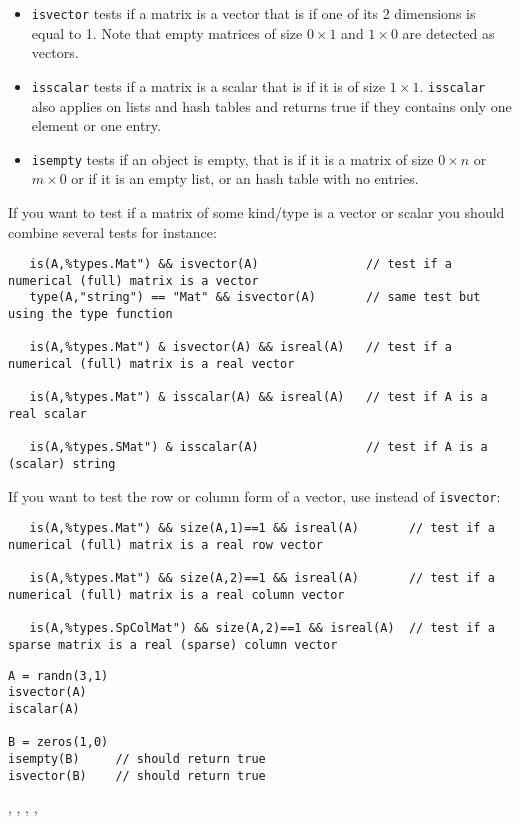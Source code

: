 \begin{mandescription}
\begin{itemize}
\item \verb+isvector+ tests if a matrix is a vector that is if one of its 2 dimensions is equal to 1. 
      Note that empty matrices of size $0 \times 1$ and $1 \times 0$ are detected as vectors.
\item \verb+isscalar+ tests if a matrix is a scalar that is if it is of size $1 \times 1$.
      \verb+isscalar+ also applies on lists and hash tables and returns true if they contains only
      one element or one entry.
\item \verb+isempty+ tests if an object is empty, that is if it is a matrix of size $0 \times n$ or $m \times 0$ or
      if it is an empty list, or an hash table with no entries.
\end{itemize}

If you want to test if a matrix of some kind/type is a vector or scalar you should combine
several tests for instance:
\begin{verbatim}
   is(A,%types.Mat") && isvector(A)               // test if a numerical (full) matrix is a vector
   type(A,"string") == "Mat" && isvector(A)       // same test but using the type function

   is(A,%types.Mat") & isvector(A) && isreal(A)   // test if a numerical (full) matrix is a real vector

   is(A,%types.Mat") & isscalar(A) && isreal(A)   // test if A is a real scalar

   is(A,%types.SMat") & isscalar(A)               // test if A is a (scalar) string
\end{verbatim}

If you want to test the row or column form of a vector, use  instead of \verb+isvector+:
\begin{verbatim}
   is(A,%types.Mat") && size(A,1)==1 && isreal(A)       // test if a numerical (full) matrix is a real row vector

   is(A,%types.Mat") && size(A,2)==1 && isreal(A)       // test if a numerical (full) matrix is a real column vector

   is(A,%types.SpColMat") && size(A,2)==1 && isreal(A)  // test if a sparse matrix is a real (sparse) column vector
\end{verbatim}

\end{mandescription}

\begin{examples}
\begin{Verbatim}
A = randn(3,1)
isvector(A)
iscalar(A)

B = zeros(1,0)
isempty(B)     // should return true
isvector(B)    // should return true
\end{Verbatim}
\end{examples}

\begin{manseealso}
   , , , ,  
\end{manseealso}

